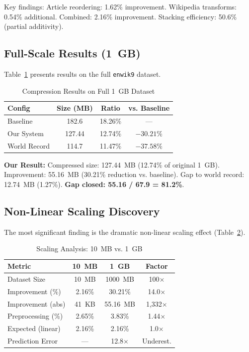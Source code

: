 \documentclass[conference]{IEEEtran}
\newcommand{\enwik}{{\tt enwik9}}
\begin{document}
Key findings: Article reordering: 1.62\% improvement. Wikipedia transforms: 0.54\% additional. Combined: 2.16\% improvement. Stacking efficiency: 50.6\% (partial additivity).

\subsection{Full-Scale Results (1~GB)}

Table~\ref{tab:fullscale_results} presents results on the full \enwik{} dataset.

\begin{table}[htbp]
\caption{Compression Results on Full 1~GB Dataset}
\label{tab:fullscale_results}
\centering
\begin{tabular}{lccc}
\toprule
\textbf{Config} & \textbf{Size (MB)} & \textbf{Ratio} & \textbf{vs. Baseline} \\
\midrule
Baseline & 182.6 & 18.26\% & --- \\
Our System & 127.44 & 12.74\% & $-30.21\%$ \\
World Record & 114.7 & 11.47\% & $-37.58\%$ \\
\bottomrule
\end{tabular}
\end{table}

\textbf{Our Result:} Compressed size: 127.44~MB (12.74\% of original 1~GB). Improvement: 55.16~MB (30.21\% reduction vs. baseline). Gap to world record: 12.74~MB (1.27\%). \textbf{Gap closed: 55.16 / 67.9 = 81.2\%}.

\subsection{Non-Linear Scaling Discovery}

The most significant finding is the dramatic non-linear scaling effect (Table~\ref{tab:scaling}).

\begin{table}[htbp]
\caption{Scaling Analysis: 10~MB vs. 1~GB}
\label{tab:scaling}
\centering
\begin{tabular}{lccc}
\toprule
\textbf{Metric} & \textbf{10~MB} & \textbf{1~GB} & \textbf{Factor} \\
\midrule
Dataset Size & 10~MB & 1000~MB & 100$\times$ \\
Improvement (\%) & 2.16\% & 30.21\% & 14.0$\times$ \\
Improvement (abs) & 41~KB & 55.16~MB & 1,332$\times$ \\
Preprocessing (\%) & 2.65\% & 3.83\% & 1.44$\times$ \\
Expected (linear) & 2.16\% & 2.16\% & 1.0$\times$ \\
Prediction Error & --- & 12.8$\times$ & Underest. \\
\bottomrule
\end{tabular}
\end{table}
\end{document}

